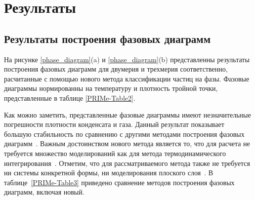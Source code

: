 \section{Результаты}
\label{PRIMe-SecResults}

\subsection{Результаты построения фазовых диаграмм}
\label{PRIMe-SubSecPhaseDiagramMD}

На рисунке \ref{phase_diagram}(a) и \ref{phase_diagram}(b) представленны результаты построения фазовых диаграмм для двумерия и трехмерия соответственно, расчитанные с помощью нового метода классификации частиц на фазы.
Фазовые диаграммы нормированны на температуру и плотность тройной точки, представленные в таблице \ref{PRIMe-Table2}.

Как можно заметить, представленные фазовые диаграммы имеют незначительные погрешности плотности конденсата и газа.
Данный результат показывает большую стабильность по сравнению с другими методами построения фазовых диаграмм~\cite{10.1021/jp806127j, 10.1021/jp1117213}.
Важным достоинством нового метода является то, что для расчета не требуется множество моделирований как для метода термодинамического интегрирования~\cite{10.1080/00268976.2019.1699185}. Отметим, что для рассматриваемого метода также не требуется ни системы конкретной формы, ни моделирования плоского слоя~\cite{10.1021/jp806127j, 10.1021/jp1117213}.
В таблице~\ref{PRIMe-Table3} приведено сравнение методов построения фазовых диаграмм, включая новый.



\begin{table}[h!]
    \caption{Сравнение различных методов построения фазовых диаграмм.
    Под 2D и 3D понимается применимость данных методов в двумерных или трехмерных системах, под скоростью -- величина затраченого времени в человеко-часах на одну точку фазовой диаграммы относительно других представленных методов, под точностью -- точность метода относительно других представленных методов.}
    \label{PRIMe-Table3}
\end{table}



